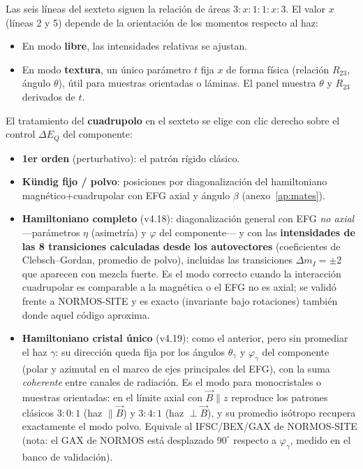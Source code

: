 Las seis líneas del sexteto siguen la relación de áreas $3:x:1:1:x:3$. El valor
$x$ (líneas 2 y 5) depende de la orientación de los momentos respecto al haz:

\begin{itemize}[nosep]
  \item En modo \textbf{libre}, las intensidades relativas se ajustan.
  \item En modo \textbf{textura}, un único parámetro $t$ fija $x$ de forma física
        (relación $R_{23}$, ángulo $\theta$), útil para muestras orientadas o
        láminas. El panel muestra $\theta$ y $R_{23}$ derivados de $t$.
\end{itemize}

El tratamiento del \textbf{cuadrupolo} en el sexteto se elige con clic derecho
sobre el control $\Delta E_Q$ del componente:

\begin{itemize}[nosep]
  \item \textbf{1er orden} (perturbativo): el patrón rígido clásico.
  \item \textbf{Kündig fijo / polvo}: posiciones por diagonalización del
        hamiltoniano magnético+cuadrupolar con EFG axial y ángulo $\beta$
        (anexo~\ref{ap:mates}).
  \item \textbf{Hamiltoniano completo} (v4.18): diagonalización general con EFG
        \emph{no axial} —parámetros $\eta$ (asimetría) y $\varphi$ del
        componente— y con las \textbf{intensidades de las 8 transiciones
        calculadas desde los autovectores} (coeficientes de Clebsch--Gordan,
        promedio de polvo), incluidas las transiciones $\Delta m_I = \pm 2$ que
        aparecen con mezcla fuerte. Es el modo correcto cuando la interacción
        cuadrupolar es comparable a la magnética o el EFG no es axial; se
        validó frente a NORMOS-SITE y es exacto (invariante bajo rotaciones)
        también donde aquel código aproxima.
  \item \textbf{Hamiltoniano cristal único} (v4.19): como el anterior, pero
        sin promediar el haz $\gamma$: su dirección queda fija por los ángulos
        $\theta_\gamma$ y $\varphi_\gamma$ del componente (polar y azimutal
        en el marco de ejes principales del EFG), con la suma \emph{coherente}
        entre canales de radiación. Es el modo para monocristales o muestras
        orientadas: en el límite axial con $\vec B \parallel z$ reproduce los
        patrones clásicos $3\!:\!0\!:\!1$ (haz $\parallel \vec B$) y
        $3\!:\!4\!:\!1$ (haz $\perp \vec B$), y su promedio isótropo
        recupera exactamente el modo polvo. Equivale al IFSC/BEX/GAX de
        NORMOS-SITE (nota: el GAX de NORMOS está desplazado $90^\circ$
        respecto a $\varphi_\gamma$, medido en el banco de validación).
\end{itemize}

